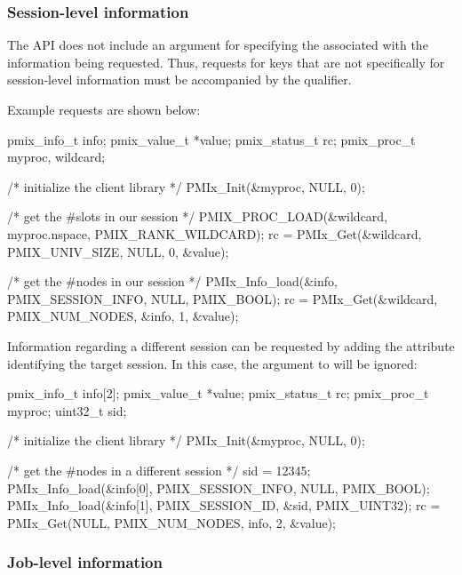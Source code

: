 \subsubsection{Session-level information}

The  \ac{API} does not include an argument for specifying the  associated with the information being requested. Thus, requests for keys that are not specifically for session-level information must be accompanied by the  qualifier.

Example requests are shown below:

\cspecificstart
\begin{codepar}
pmix_info_t info;
pmix_value_t *value;
pmix_status_t rc;
pmix_proc_t myproc, wildcard;

/* initialize the client library */
PMIx_Init(&myproc, NULL, 0);

/* get the #slots in our session */
PMIX_PROC_LOAD(&wildcard, myproc.nspace, PMIX_RANK_WILDCARD);
rc = PMIx_Get(&wildcard, PMIX_UNIV_SIZE, NULL, 0, &value);

/* get the #nodes in our session */
PMIx_Info_load(&info, PMIX_SESSION_INFO, NULL, PMIX_BOOL);
rc = PMIx_Get(&wildcard, PMIX_NUM_NODES, &info, 1, &value);
\end{codepar}
\cspecificend

Information regarding a different session can be requested by adding the  attribute identifying the target session. In this case, the  argument to  will be ignored:

\cspecificstart
\begin{codepar}
pmix_info_t info[2];
pmix_value_t *value;
pmix_status_t rc;
pmix_proc_t myproc;
uint32_t sid;

/* initialize the client library */
PMIx_Init(&myproc, NULL, 0);

/* get the #nodes in a different session */
sid = 12345;
PMIx_Info_load(&info[0], PMIX_SESSION_INFO, NULL, PMIX_BOOL);
PMIx_Info_load(&info[1], PMIX_SESSION_ID, &sid, PMIX_UINT32);
rc = PMIx_Get(NULL, PMIX_NUM_NODES, info, 2, &value);
\end{codepar}
\cspecificend


\subsubsection{Job-level information}


